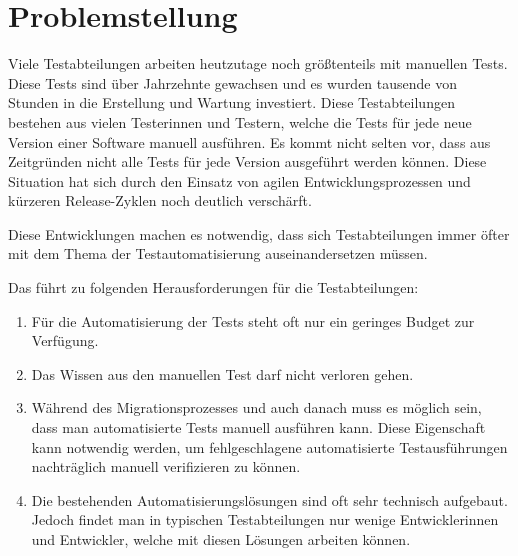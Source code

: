 
\section{Problemstellung}

Viele Testabteilungen arbeiten heutzutage noch größtenteils mit manuellen Tests. Diese Tests sind über Jahrzehnte gewachsen und es wurden tausende von Stunden in die Erstellung und Wartung investiert. Diese Testabteilungen bestehen aus vielen Testerinnen und Testern, welche die Tests für jede neue Version einer Software manuell ausführen. Es kommt nicht selten vor, dass aus Zeitgründen nicht alle Tests für jede Version ausgeführt werden können. Diese Situation hat sich durch den Einsatz von agilen Entwicklungsprozessen und kürzeren Release-Zyklen noch deutlich verschärft. 

\SuperPar
Diese Entwicklungen machen es notwendig, dass sich Testabteilungen immer öfter mit dem Thema der Testautomatisierung auseinandersetzen müssen. 

\SuperPar
Das führt zu folgenden Herausforderungen für die Testabteilungen:\\

\begin{enumerate}

\item Für die Automatisierung der Tests steht oft nur ein geringes Budget zur Verfügung.\\
	
\item Das Wissen aus den manuellen Test darf nicht verloren gehen.\\
	
\item Während des Migrationsprozesses und auch danach muss es möglich sein, dass man automatisierte Tests manuell ausführen kann. Diese Eigenschaft kann notwendig werden, um fehlgeschlagene automatisierte Testausführungen nachträglich manuell verifizieren zu können.\\

\item Die bestehenden Automatisierungslösungen sind oft sehr technisch aufgebaut. Jedoch findet man in typischen Testabteilungen nur wenige Entwicklerinnen und Entwickler, welche mit diesen Lösungen arbeiten können.

\end{enumerate}

